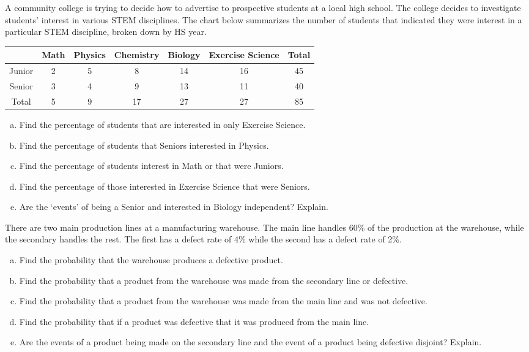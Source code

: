 \documentclass[11pt,letterpaper]{article}
\begin{document}

 A community college is trying to decide how to advertise to prospective students at a local high school. The college decides to investigate students' interest in various STEM disciplines. The chart below summarizes the number of students that indicated they were interest in a particular STEM discipline, broken down by HS year. \par
	\begin{table}[H]
	\centering
	\begin{tabular}{|c||ccccc||c|} \hline
	& Math & Physics & Chemistry & Biology & Exercise Science & Total \\ \hline
	Junior & 2 & 5 & 8 & 14 & 16 & 45 \\ 
	Senior & 3 & 4 & 9 & 13 & 11 & 40 \\ \hline
	Total & 5 & 9 & 17 & 27 & 27 & 85 \\ \hline
	\end{tabular}
	\end{table} 

\begin{enumerate}[(a)]
\item Find the percentage of students that are interested in only Exercise Science. 
\item Find the percentage of students that Seniors interested in Physics. 
\item Find the percentage of students interest in Math or that were Juniors. 
\item Find the percentage of those interested in Exercise Science that were Seniors. 
\item Are the `events' of being a Senior and interested in Biology independent? Explain. 
\end{enumerate}



\newpage



 There are two main production lines at a manufacturing warehouse. The main line handles 60\% of the production at the warehouse, while the secondary handles the rest. The first has a defect rate of 4\% while the second has a defect rate of 2\%. 
	\begin{enumerate}[(a)]
	\item Find the probability that the warehouse produces a defective product. 
	\item Find the probability that a product from the warehouse was made from the secondary line or defective. 
	\item Find the probability that a product from the warehouse was made from the main line and was not defective. 
	\item Find the probability that if a product was defective that it was produced from the main line. 
	\item Are the events of a product being made on the secondary line and the event of a product being defective disjoint? Explain. 
	\end{enumerate}
\end{document}
